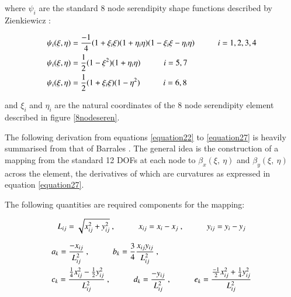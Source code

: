 where $\psi_i$ are the standard 8 node serendipity shape functions described by Zienkiewicz \cite{Zie77}:

\begin{gather} 
	\begin{aligned}
		&\psi_i (\xi , \eta) = \frac{-1}{4} (1 + \xi_i \xi)(1 + \eta_i \eta)(1 - \xi_i \xi - \eta_i \eta)
		\hspace{10mm}
		i = 1, 2, 3, 4 \\
		&\psi_i (\xi , \eta) = \frac{1}{2} (1 - \xi^2)(1 + \eta_i \eta)
		\hspace{10mm}
		i = 5, 7 \\
		&\psi_i (\xi , \eta) = \frac{1}{2} (1 + \xi_i \xi)(1 - \eta^2)
		\hspace{10mm}
		i = 6, 8
		\label{equation21}
	\end{aligned}
\end{gather}

and $\xi_i$ and $\eta_i$ are the natural coordinates of the 8 node serendipity element described in figure \ref{8nodeseren}.

The following derivation from equations \eqref{equation22} to \eqref{equation27} is heavily summarised from that of Barrales \cite{Bar12}. The general idea is the construction of a mapping from the standard 12 DOFs at each node to $\beta_x (\xi,\ \eta)$ and $\beta_y (\xi,\ \eta)$ across the element, the derivatives of which are curvatures as expressed in equation \eqref{equation27}.

The following quantities are required components for the mapping:

\begin{equation} 
L_{ij} = \sqrt{x_{ij}^2 + y_{ij}^2}\ ,
\hspace{10mm}
x_{ij} = x_i - x_j\ ,
\hspace{10mm}
y_{ij} = y_i - y_j
\label{equation22}
\end{equation}

\begin{gather} 
	\begin{aligned}
		&a_k = \frac{-x_{ij}}{L_{ij}^2}\ ,
		\hspace{10mm}
		b_k = \frac{3}{4} \frac{x_{ij} y_{ij}}{L_{ij}^2}\ , \\
		&c_k = \frac{\frac{1}{4} x_{ij}^2 - \frac{1}{2} y_{ij}^2}{L_{ij}^2}\ ,
		\hspace{10mm}
		d_k = \frac{-y_{ij}}{L_{ij}^2}\ ,
		\hspace{10mm}
		e_k = \frac{\frac{-1}{2} x_{ij}^2 + \frac{1}{4} y_{ij}^2}{L_{ij}^2}
		\label{equation23}
	\end{aligned}
\end{gather}

